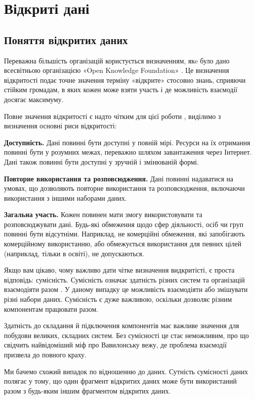 \chapter{Відкриті дані}

\section{Поняття відкритих даних}

Переважна більшість організацій користується визначенням, якe було дано всесвітньою організацією «Open Knowledge Foundation» \cite{OpenDefinition}.
Це визначення відкритості подає точне значення терміну «відкрите» стосовно знань,
сприяючи стійким громадам, в яких кожен може взяти участь
і де можливість взаємодії досягає максимуму.

Повне значення відкритості є надто чітким для цієї роботи \cite{OpendataHandBook},
виділимо з визначення основні риси відкритості:

\textbf{Доступність.}
Дані повинні бути доступні у повній мірі. Ресурси на їх отримання повинні бути
у розумних межах, переважно шляхом завантаження через Інтернет.
Дані також повинні бути доступні у зручній і змінюваній формі.

\textbf{Повторне використання та розповсюдження.}
Дані повинні надаватися на умовах, що дозволяють повторне
використання та розповсюдження, включаючи
використання з іншими наборами даних.

\textbf{Загальна участь.}
Кожен повинен мати змогу використовувати та розповсюджувати дані.
Будь-які обмеження щодо сфер діяльності, осіб чи груп повинні бути відсутніми.
Наприклад, не комерційні обмеження, які запобігають комерційному використанню,
або обмежується використання для певних цілей (наприклад, тільки в освіті), не допускаються.

Якщо вам цікаво, чому важливо дати чітке визначення видкритісті, є проста відповідь: сумісність.
Сумісність означає здатність різних систем та організацій взаємодіяти разом \cite{BigDataOpenData}.
У даному випадку це можливість взаємодіяти або змішувати різні набори даних.
Сумісність є дуже важливою, оскільки дозволяє різним компонентам працювати разом.

Здатність до складання й підключення компонентів має важливе
значення для побудови великих, складних систем.
Без сумісності це стає неможливим, про що свідчить найвідоміший міф про
Вавилонську вежу, де проблема взаємодії призвела до повного краху.

Ми бачемо схожий випадок по відношенню до даних.
Сутність сумісності даних полягає у тому, що один фрагмент відкритих
даних може бути використаний разом з будь-яким іншим фрагментом відкритих даних.

